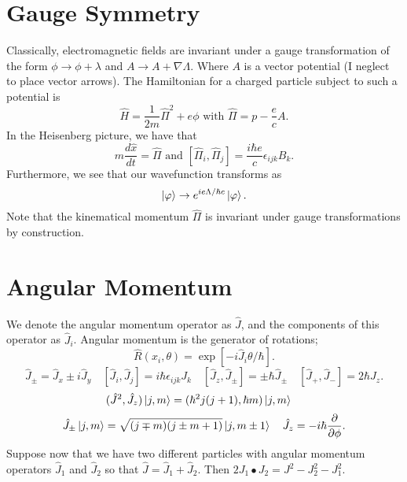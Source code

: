 \documentclass{article}
\begin{document}
  \section*{Gauge Symmetry}
    Classically, electromagnetic fields are invariant under a gauge transformation
    of the form $\phi \rightarrow \phi + \lambda$ and  $A \rightarrow A + \nabla \Lambda$. 
    Where $A$ is a vector potential (I neglect to place vector arrows). 
    The Hamiltonian for a charged particle subject to such a potential is 
     \[
       \hat H = \frac{1}{2m} \hat \Pi^2 + e \phi \text{ with } \hat\Pi = p - \frac{e}{c}A
    .\] 
    In the Heisenberg picture, we have that \[
      m \frac{d\hat{x}}{d t} = \hat{\Pi} \text{ and } [\hat{\Pi}_i,\hat{\Pi}_j] = 
      \frac{i \hbar e}{c }\epsilon_{ijk} B_k
    .\] 
    Furthermore, we see that our wavefunction transforms as \[
      \ket{\varphi} \rightarrow e^{i e \Lambda / \hbar c}\ket{\varphi}
    .\] 
    Note that the kinematical momentum $\hat \Pi $ is invariant under gauge
    transformations by construction. 

  \section*{Angular Momentum}
    We denote the angular momentum operator as $\hat J$, and the components of this
    operator as  $\hat J _i $.
    Angular momentum is the generator of rotations; 
    \[
      \hat{R}(x_i,\theta) = \exp[- i \hat J _i \theta / \hbar]
    .\] 
    \[
      \hat{J}_\pm = \hat{J}_x \pm i \hat{J}_y \quad
      [\hat J _i, \hat J _j] = i \hbar \epsilon_{ijk} J_k \quad 
      [\hat J _z, \hat{J}_\pm] = \pm \hbar \hat{J}_\pm \quad
      [\hat J _+, \hat J _-] = 2\hbar J_z
    .\]\[
    (\hat{J}^2, \hat{J}_z)\ket{j,m} = (\hbar^2j(j+1),\hbar m)\ket{j,m} \quad
    \]\[
    \hat{J}_{\pm} \ket{j,m} = \sqrt{(j\mp m)(j \pm m + 1)}\ket{j,m\pm 1} \quad
    \hat{J}_z = -i\hbar\frac{\partial}{\partial \phi}
    .\]   
    Suppose now that we have two different particles with angular momentum 
    operators $\hat J _1$ and $\hat J _2$ so that  $\hat J = \hat J _1 +\hat J_2$.
    Then  $2 J_1 \bullet J_2 = J^2 - J_2^2 - J_1^2$.


    
\end{document}

